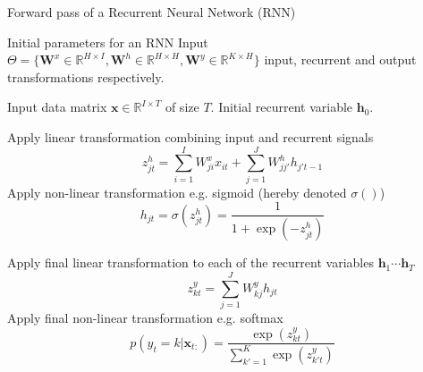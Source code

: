 \begin{algorithm}[th!]
\label{algo:rnnforward}
   \caption{Forward pass of a Recurrent Neural Network (RNN)}
\begin{algorithmic}[1]

    Initial parameters for an RNN Input
$\Theta=\{\mathbf{W}^x \in \mathbb{R}^{H \times I}, \mathbf{W}^h \in \mathbb{R}^{H \times H}, \mathbf{W}^y \in \mathbb{R}^{K \times H} \}$ input, recurrent and output transformations respectively.

    Input data matrix $\mathbf{x} \in \mathbb{R}^{I \times T}$ of size $T$. Initial recurrent variable $\mathbf{h}_0$. 

     \STATE Apply linear transformation combining input and recurrent signals
        $$z_{jt}^h = \sum_{i=1}^{I} W_{ji}^x x_{it} + \sum_{j=1}^{J} W_{jj'}^h h_{j't-1}$$
     \STATE Apply non-linear transformation e.g. sigmoid (hereby denoted $\sigma()$)
     $$h_{jt} = \sigma(z_{jt}^h)  = \frac{1}{1+\exp(-z_{jt}^h)}$$

	\ENDFOR

\STATE Apply final linear transformation to each of the recurrent variables $\mathbf{h}_1 \cdots \mathbf{h}_T$ 
   $$z_{kt}^y = \sum_{j=1}^{J} W_{kj}^y h_{jt}$$
\STATE Apply final non-linear transformation e.g. softmax 
$$p(y_t=k|\mathbf{x}_{t:}) = \frac{\exp(z_{kt}^y)}{\sum_{k'=1}^{K} \exp(z_{k't}^y)}$$

\end{algorithmic}
\end{algorithm}

